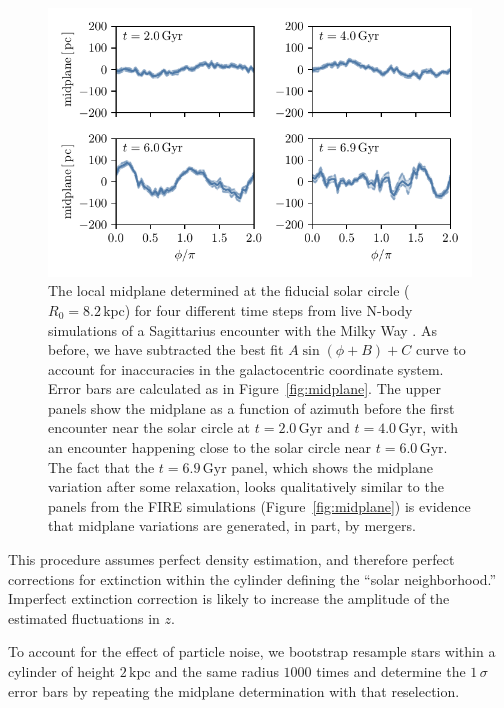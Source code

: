 \documentclass[twocolumn]{aastex62}
\newcommand{\kpc}{\text{kpc}}
\newcommand{\Gyr}{\text{Gyr}}
\begin{document}
\begin{figure}[htb!]
\begin{center}
\includegraphics[width=342.078286667pt]{fig/midplane_fit_chervinsim.pdf}
\end{center}
\caption{The local midplane determined at the fiducial solar circle
($R_0 = 8.2\,\kpc$) for four different time steps from live N-body simulations of a
Sagittarius encounter with the Milky Way \citep{2018MNRAS.481..286L}. As
before, we have subtracted the best fit $A\sin{(\phi+B)}+C$ curve to account
for inaccuracies in the galactocentric coordinate system. Error bars are
calculated as in Figure~\ref{fig:midplane}. The upper panels
show the midplane as a function of azimuth before the first encounter near the
solar circle at $t=2.0\,\Gyr$ and $t=4.0\,\Gyr$, with an encounter happening close to the solar circle near $t=6.0\,\Gyr$. The fact that the $t=6.9\,\Gyr$ panel, which shows the midplane variation after some relaxation,
looks qualitatively similar to the panels from the FIRE simulations
(Figure~\ref{fig:midplane}) is evidence that midplane variations are
generated, in part, by mergers.}
\label{fig:midplane_chervin}
\end{figure}

This procedure assumes perfect density estimation, and therefore perfect
corrections for extinction within the cylinder defining the ``solar
neighborhood.'' Imperfect extinction correction is likely to increase the
amplitude of the estimated fluctuations in $z$.

To account for the effect of particle noise, we bootstrap resample stars
within a cylinder of height $2\,\kpc$ and the same radius $1000$
times and determine the $1\,\sigma$ error bars by repeating the midplane
determination with that reselection.
\end{document}
